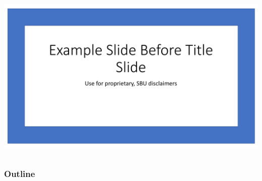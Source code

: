 



\ifnum{}
  \vspace{-0.1in}
  \begin{frame}
  \begin{columns}
  \includegraphics[width=1.0\textwidth,page=1]{Images/pre-titleslide.pdf}
  \end{columns}
  \end{frame}
\fi

\begin{frame}
\titlepage
\end{frame}


\begin{frame}
\frametitle{Outline}
\tableofcontents
\end{frame}


